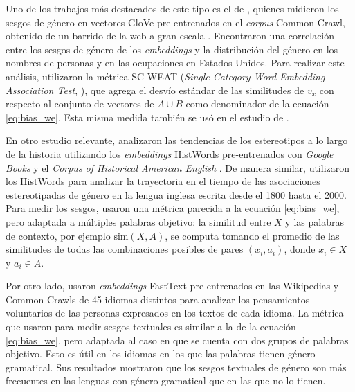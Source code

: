 Uno de los trabajos más destacados de este tipo es el de \citet{caliskan2017semantics}, quienes midieron los sesgos de género en vectores GloVe pre-entrenados en el \emph{corpus} Common Crawl, obtenido de un barrido de la web a gran escala \citep{pennington2014glove}. Encontraron una correlación entre los sesgos de género de los \emph{embeddings} y la distribución del género en los nombres de personas y en las ocupaciones en Estados Unidos. Para realizar este análisis, utilizaron la métrica SC-WEAT (\emph{Single-Category Word Embedding Association Test}, \citealp{toney2021valnorm}), que agrega el desvío estándar de las similitudes de $v_x$ con respecto al conjunto de vectores de $A \cup B$ como denominador de la ecuación \ref{eq:bias_we}. Esta misma medida también se usó en el estudio de \citet{charlesworth2021gender}.


En otro estudio relevante, \citet{garg2018word} analizaron las tendencias de los estereotipos a lo largo de la historia utilizando los \emph{embeddings} HistWords pre-entrenados con \emph{Google Books} y el \emph{Corpus of Historical American English} \citep{hamilton2016diachronic}. De manera similar, \citet{jones2020stereotypical} utilizaron los HistWords para analizar la trayectoria en el tiempo de las asociaciones estereotipadas de género en la lengua inglesa escrita desde el 1800 hasta el 2000. Para medir los sesgos, usaron una métrica parecida a la ecuación \ref{eq:bias_we}, pero adaptada a múltiples palabras objetivo: la similitud entre $X$ y las palabras de contexto, por ejemplo $\text{sim}(X,A)$, se computa tomando el promedio de las similitudes de todas las combinaciones posibles de pares $(x_i,a_i)$, donde $x_i \in X$ y $a_i \in A$.

Por otro lado, \citet{defranza2020language} usaron \emph{embeddings} FastText pre-entrenados en las Wikipedias y Common Crawls de 45 idiomas distintos para analizar los pensamientos voluntarios de las personas expresados en los textos de cada idioma. La métrica que usaron para medir sesgos textuales es similar a la de la ecuación \ref{eq:bias_we}, pero adaptada al caso en que se cuenta con dos grupos de palabras objetivo. Esto es útil en los idiomas en los que las palabras tienen género gramatical. Sus resultados mostraron que los sesgos textuales de género son más frecuentes en las lenguas con género gramatical que en las que no lo tienen.

